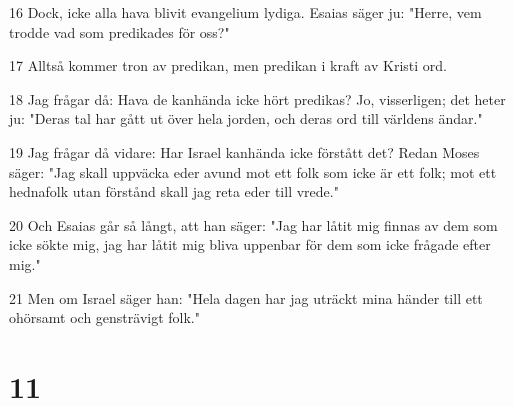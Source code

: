 \par 16 Dock, icke alla hava blivit evangelium lydiga. Esaias säger ju: "Herre, vem trodde vad som predikades för oss?"
\par 17 Alltså kommer tron av predikan, men predikan i kraft av Kristi ord.
\par 18 Jag frågar då: Hava de kanhända icke hört predikas? Jo, visserligen; det heter ju: "Deras tal har gått ut över hela jorden, och deras ord till världens ändar."
\par 19 Jag frågar då vidare: Har Israel kanhända icke förstått det? Redan Moses säger: "Jag skall uppväcka eder avund mot ett folk som icke är ett folk; mot ett hednafolk utan förstånd skall jag reta eder till vrede."
\par 20 Och Esaias går så långt, att han säger: "Jag har låtit mig finnas av dem som icke sökte mig, jag har låtit mig bliva uppenbar för dem som icke frågade efter mig."
\par 21 Men om Israel säger han: "Hela dagen har jag uträckt mina händer till ett ohörsamt och gensträvigt folk."

\chapter{11}


